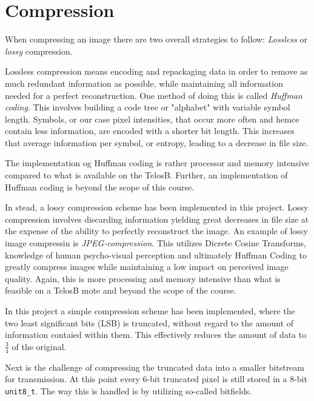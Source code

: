 \section{Compression}
When compressing an image there are two overall strategies to follow:
\emph{Lossless} or \emph{lossy} compression.

Lossless compression means encoding and repackaging data in order to remove as much redundant information as possible, while maintaining all information needed for a perfect reconstruction. 
One method of doing this is called \emph{Huffman coding}.
This involves building a code tree or "alphabet" with variable symbol length.
Symbols, or our case pixel intensities, that occur more often and hemce contain less information, are encoded with a shorter bit length. 
This increases that average information per symbol, or entropy, leading to a decrease in file size.

The implementation og Huffman coding is rather processor and memory intensive compared to what is available on the TelosB.
Further, an implementation of Huffman coding is beyond the scope of this course.

In stead, a lossy compression scheme has been implemented in this project.
Lossy compression involves discarding information yielding great decreases in file size at the expense of the ability to perfectly reconstruct the image.
An example of lossy image compressin is \emph{JPEG-compression}.
This utilizes Dicrete Cosine Transforms, knowledge of human psycho-visual perception and ultimately Huffman Coding to greatly compress images while maintaining a low impact on perceived image quality.
Again, this is more processing and memory intensive than what is feasible on a TelosB mote and beyond the scope of the course.

In this project a simple compression scheme has been implemented, where the two least significant  bits (LSB) is truncated, without regard to the amount of information contaied within them.
This effectively reduces the amount of data to $ \frac{3}{4} $ of the original. 

Next is the challenge of compressing the truncated data into a smaller bitstream for transmission.
At this point every 6-bit truncated pixel is still stored in a 8-bit \texttt{unit8\_t}.
The way this is handled is by utilizing so-called bitfields.

